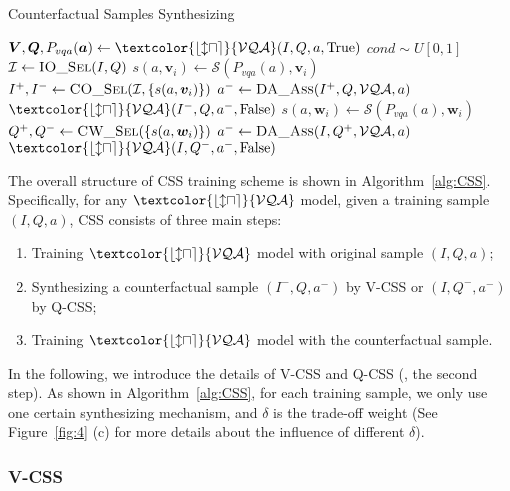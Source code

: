 \documentclass[10pt,twocolumn,letterpaper]{article}
\begin{document}
\begin{algorithm}[tbp]
	\caption{Counterfactual Samples Synthesizing}\label{alg:CSS}
	\begin{algorithmic}[1]
		\State $ \bm{V}, \bm{Q}, P_{vqa}(\bm{a}) \leftarrow \mathcal{\textcolor{blue}{VQA}}(I, Q, a, \text{True})$
		\State $ cond \sim U[0, 1]$
		  
			\State $ \mathcal{I} \leftarrow  \textsc{IO\_Sel}(I, Q) $
			\State $ s(a, \bm{v}_i) \leftarrow \mathcal{S}(P_{vqa}(a), \bm{v}_i)$
			\State $ I^+, I^- \leftarrow \textsc{CO\_Sel}(\mathcal{I}, \{s(a, \bm{v}_i) \}) $
			\State $ a^- \leftarrow \textsc{DA\_Ass}(I^+, Q, \mathcal{VQA}, a) $
			\State $ \mathcal{\textcolor{blue}{VQA}}(I^-, Q, a^-, \text{False})$
		\Else {}
			\State $ s(a, \bm{w}_i) \leftarrow \mathcal{S}(P_{vqa}(a), \bm{w}_i) $
			\State $ Q^+, Q^- \leftarrow \textsc{CW\_Sel}(\{s(a, \bm{w}_i)\})$
			\State $ a^- \leftarrow \textsc{DA\_Ass}(I, Q^+, \mathcal{VQA}, a) $
			\State $ \mathcal{\textcolor{blue}{VQA}}(I, Q^-, a^-, \text{False})$
		\EndIf
		\EndFunction
	\end{algorithmic}
\end{algorithm}

The overall structure of CSS training scheme is shown in Algorithm~\ref{alg:CSS}. Specifically, for any $\mathcal{\textcolor{blue}{VQA}}$ model, given a training sample $(I, Q, a)$, CSS consists of three main steps: 
\begin{enumerate}
	\vspace{-0.6em}
	\itemsep -0.2em
	\item Training $\mathcal{\textcolor{blue}{VQA}}$ model with original sample $(I, Q, a)$;
	\item Synthesizing a counterfactual sample $(I^-, Q, a^-)$ by V-CSS or $(I, Q^-, a^-)$ by Q-CSS;
	\item Training $\mathcal{\textcolor{blue}{VQA}}$ model with the counterfactual sample.
	\vspace{-0.6em}
\end{enumerate}

In the following, we introduce the details of V-CSS and Q-CSS (\ie, the second step). As shown in Algorithm~\ref{alg:CSS}, for each training sample, we only use one certain synthesizing mechanism, and $\delta$ is the trade-off weight (See Figure~\ref{fig:4} (c) for more details about the influence of different $\delta$).

\subsubsection{V-CSS} \label{sec:v-css}
\end{document}
